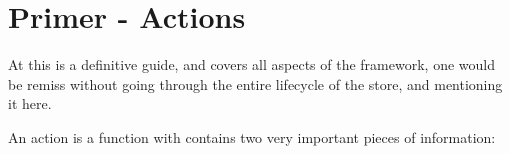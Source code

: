 \maketitle{}
\section{ Primer - Actions }
At this is a definitive guide, and covers all aspects of the framework, one
would be remiss without going through the entire lifecycle of the store, and
mentioning it here.

An action is a function with contains two very important pieces of information:
